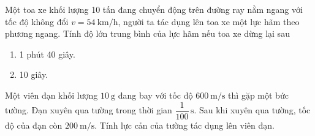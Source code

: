 \begin{ex}
Một toa xe khối lượng 10 tấn đang chuyển động trên đường ray nằm ngang với tốc độ không đổi $v=\SI{54}{\kilo\meter/\hour}$, người ta tác dụng lên toa xe một lực hãm theo phương ngang. Tính độ lớn trung bình của lực hãm nếu toa xe dừng lại sau
\begin{enumerate}[label=\alph*)]
	\item 1 phút 40 giây.
	\item 10 giây.
\end{enumerate}	
\end{ex}
\begin{ex}
Một viên đạn khối lượng $\SI{10}{\gram}$ đang bay với tốc độ $\SI{600}{\meter/\second}$ thì gặp một bức tường. Đạn xuyên qua tường trong thời gian $\dfrac{1}{100}\,\text{s}$. Sau khi xuyên qua tường, tốc độ của đạn còn $\SI{200}{\meter/\second}$. Tính lực cản của tường tác dụng lên viên đạn.	
\end{ex}
